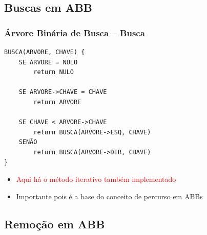 \subsection{Buscas em ABB}
\begin{frame}[fragile]
\frametitle{Árvore Binária de Busca -- Busca}
\begin{verbatim}
BUSCA(ARVORE, CHAVE) {
    SE ARVORE = NULO
        return NULO
        
    SE ARVORE->CHAVE = CHAVE
        return ARVORE 
    
    SE CHAVE < ARVORE->CHAVE
        return BUSCA(ARVORE->ESQ, CHAVE)
    SENÃO
        return BUSCA(ARVORE->DIR, CHAVE)
}
\end{verbatim}
\begin{itemize}
  \item \textcolor{red}{Aqui há o método iterativo também implementado}
  \item Importante pois é a base  do conceito de percurso em ABBs
\end{itemize}

\end{frame}


\subsection{Remoção em ABB}

